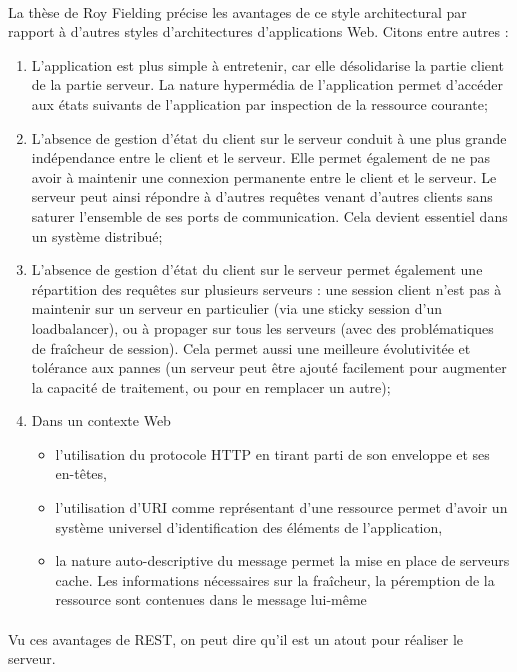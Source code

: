 \documentclass{report}
\begin{document}
\paragraph{}
La thèse de Roy Fielding précise les avantages de ce style architectural par rapport à d’autres styles d’architectures 
d’applications Web. Citons entre autres :

\begin{enumerate}
\item L’application est plus simple à entretenir, car elle désolidarise la partie client de la partie serveur. La nature 
hypermédia de l'application permet d'accéder aux états suivants de l'application par inspection de la ressource courante;
\item L'absence de gestion d’état du client sur le serveur conduit à une plus grande indépendance entre le client et le 
serveur. Elle permet également de ne pas avoir à maintenir une connexion permanente entre le client et le serveur. 
Le serveur peut ainsi répondre à d'autres requêtes venant d'autres clients sans saturer l'ensemble de ses ports de 
communication. Cela devient essentiel dans un système distribué;
\item L’absence de gestion d’état du client sur le serveur permet également une répartition des requêtes sur plusieurs 
serveurs : une session client n’est pas à maintenir sur un serveur en particulier (via une sticky session d’un loadbalancer), ou à propager sur tous les serveurs (avec des problématiques de fraîcheur de session). Cela permet aussi une meilleure 
évolutivitée et tolérance aux pannes (un serveur peut être ajouté facilement pour augmenter la capacité de traitement, ou pour en remplacer un autre);
\item Dans un contexte Web
    \begin{itemize}
    \item l’utilisation du protocole HTTP en tirant parti de son enveloppe et ses en-têtes,
    \item l’utilisation d’URI comme représentant d’une ressource permet d'avoir un système universel d'identification des 
     éléments de l'application,
    \item la nature auto-descriptive du message permet la mise en place de serveurs cache. Les informations nécessaires
     sur la fraîcheur, la péremption de la ressource sont contenues dans le message lui-même
    \end{itemize}
\end{enumerate}

\paragraph{}
Vu ces avantages de REST, on peut dire qu'il est un atout pour réaliser le serveur. 
\end{document}
